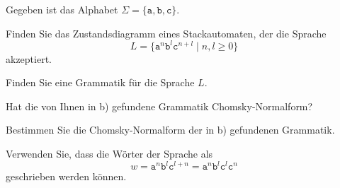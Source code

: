 Gegeben ist das Alphabet $\Sigma=\{\texttt{a},\texttt{b},\texttt{c}\}$.
\begin{teilaufgaben}
\item
Finden Sie das Zustandsdiagramm eines Stackautomaten, der die Sprache
\[
L
=
\{ \texttt{a}^n \texttt{b}^l \texttt{c}^{n+l}\mid  n,l\ge 0\}
\]
akzeptiert.
\item
Finden Sie eine Grammatik für die Sprache $L$.
\item
Hat die von Ihnen in b) gefundene Grammatik Chomsky-Normalform?
\item 
Bestimmen Sie die Chomsky-Normalform der in b) gefundenen Grammatik.
\end{teilaufgaben}


\begin{hinweis}
Verwenden Sie, dass die Wörter der Sprache als
\[
w
=
\texttt{a}^n \texttt{b}^l \texttt{c}^{l+n}
=
\texttt{a}^n \texttt{b}^l \texttt{c}^{l} \texttt{c}^{n}
\]
geschrieben werden können.
\end{hinweis}

